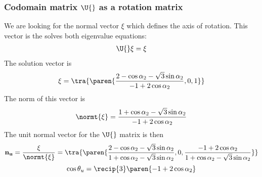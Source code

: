 \subsubsection{Codomain matrix $\U{}$ as a rotation matrix}
We are looking for the normal vector $\xi$ which defines the axis of rotation. This vector is the solves both eigenvalue equations:
%
\begin{equation}
  \begin{split}
    \U{} \xi  &= \xi \\
  \end{split}
\end{equation}
%
The solution vector is
%
\begin{equation}
  \xi = \tra{\paren{
   \frac{2 - \cos \alpha_{2} - \sqrt{3} \sin \alpha_{2}} {-1 + 2 \cos \alpha_{2}},
   0, 1  }}
   \label{eq:fixed point:u}
\end{equation}
The norm of this vector is
\begin{equation}
  \normt{ \xi } = \frac{1 + \cos \alpha_{2} - \sqrt{3} \sin \alpha_{2}} {-1 + 2 \cos \alpha_{2}}
\end{equation}
The unit normal vector for the $\U{}$ matrix is then
\begin{equation}
  \mathbf{n_{u}} = \frac{ \xi } { \normt{ \xi } } = \tra{ \paren{ \frac{2 - \cos \alpha_{2} - \sqrt{3} \sin \alpha_{2}} {1 + \cos \alpha_{2} - \sqrt{3} \sin \alpha_{2}}, 0, \frac{-1 + 2 \cos \alpha_{2}}{1 + \cos \alpha_{2} - \sqrt{3} \sin \alpha_{2}}} }
\end{equation}
%
\begin{equation}
  \cos \theta_{u} = \recip{3} \paren{-1 + 2 \cos \alpha_{2}} 
  \label{eq:3d 01:u:theta}
\end{equation}

